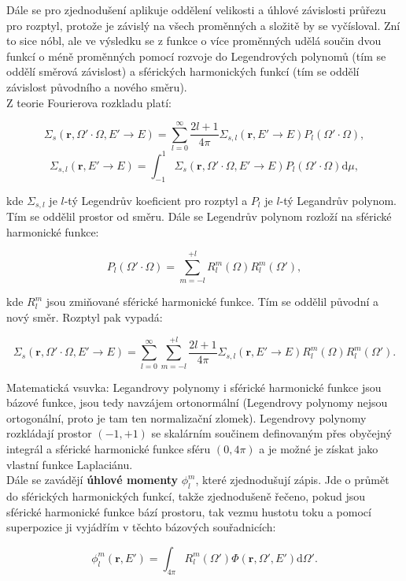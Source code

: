 Dále se pro zjednodušení aplikuje oddělení velikosti a úhlové závislosti průřezu pro rozptyl, protože je závislý na všech proměnných a složitě by se vyčísloval. Zní to sice nóbl, ale ve výsledku se z funkce o více proměnných udělá součin dvou funkcí o méně proměnných pomocí rozvoje do Legendrových polynomů  (tím se oddělí směrová závislost) a sférických harmonických funkcí (tím se oddělí závislost původního a nového směru). \\

Z teorie Fourierova rozkladu platí:

$$\Sigma_s(\textbf{r}, \Omega' \cdot \Omega, E' \rightarrow E) = \sum_{l=0}^{\infty} \dfrac{2l + 1}{4 \pi} \Sigma_{s,l}(\textbf{r}, E' \rightarrow E) P_l(\Omega' \cdot \Omega),$$
$$\Sigma_{s,l}(\textbf{r}, E' \rightarrow E) = \int_{-1}^1 \Sigma_s(\textbf{r}, \Omega' \cdot \Omega, E' \rightarrow E) P_l(\Omega' \cdot \Omega) \text{d}\mu,$$

\noindent kde $\Sigma_{s,l}$ je $l$-tý Legendrův koeficient pro rozptyl a $P_l$ je $l$-tý Legandrův polynom. Tím se oddělil prostor od směru. Dále se Legendrův polynom rozloží na sférické harmonické funkce:

$$P_l(\Omega' \cdot \Omega) = \sum_{m=-l}^{+l} R_l^m(\Omega) R_l^m(\Omega'),$$

\noindent kde $R_l^m$ jsou zmiňované sférické harmonické funkce. Tím se oddělil původní a nový směr. Rozptyl pak vypadá:

$$\Sigma_s(\textbf{r}, \Omega' \cdot \Omega, E' \rightarrow E) = \sum_{l=0}^{\infty} \sum_{m=-l}^{+l} \dfrac{2l + 1}{4 \pi} \Sigma_{s,l}(\textbf{r}, E' \rightarrow E) R_l^m(\Omega) R_l^m(\Omega').$$

Matematická vsuvka: Legandrovy polynomy i sférické harmonické funkce jsou bázové funkce, jsou tedy navzájem ortonormální (Legendrovy polynomy nejsou ortogonální, proto je tam ten normalizační zlomek). Legendrovy polynomy rozkládají prostor $(-1, +1)$ se skalárním součinem definovaným přes obyčejný integrál a sférické harmonické funkce sféru $(0, 4 \pi)$ a je možné je získat jako vlastní funkce Laplaciánu.\\

Dále se zavádějí \textbf{úhlové momenty} $\phi_l^m$, které zjednodušují zápis. Jde o průmět do sférických harmonických funkcí, takže zjednodušeně řečeno, pokud jsou sférické harmonické funkce bází prostoru, tak vezmu hustotu toku a pomocí superpozice ji vyjádřím v těchto bázových souřadnicích:

$$\phi_l^m(\textbf{r}, E') = \int_{4 \pi} R_l^m (\Omega') \Phi(\textbf{r}, \Omega', E') \text{d}\Omega'.$$

